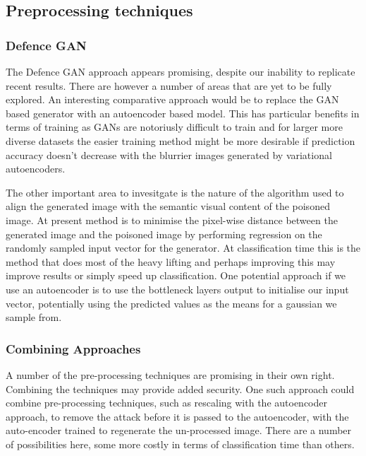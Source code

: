 \subsection{Preprocessing techniques}

\subsubsection{Defence GAN}
The Defence GAN approach appears promising, despite our inability to replicate recent results.  There are however a number of areas that are yet to be fully explored.  An interesting comparative approach would be to replace the GAN based generator with an autoencoder based model.  This has particular benefits in terms of training as GANs are notoriusly difficult to train and for larger more diverse datasets the easier training method might be more desirable if prediction accuracy doesn't decrease with the blurrier images generated by variational autoencoders.

The other important area to invesitgate is the nature of the algorithm used to align the generated image with the semantic visual content of the poisoned image.  At present method is to minimise the pixel-wise distance between the generated image and the poisoned image by performing regression on the randomly sampled input vector for the generator.  At classification time this is the method that does most of the heavy lifting and perhaps improving this may improve results or simply speed up classification.  One potential approach if we use an autoencoder is to use the bottleneck layers output to initialise our input vector, potentially using the predicted values as the means for a gaussian we sample from.

\subsubsection{Combining Approaches}
A number of the pre-processing techniques are promising in their own right. Combining the techniques may provide added security.  One such approach could combine pre-processing techniques, such as rescaling with the autoencoder approach, to remove the attack before it is passed to the autoencoder, with the auto-encoder trained to regenerate the un-processed image.  There are a number of possibilities here, some more costly in terms of classification time than others.